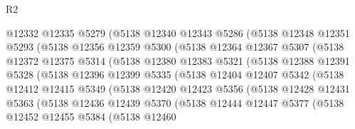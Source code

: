 \begin{lexlean}{R2}
\begin{coremodule}
                  @12332
                  @12335
                  @5279
                  (@5138
                    @12340
                    @12343
                    @5286
                    (@5138
                      @12348
                      @12351
                      @5293
                      (@5138
                        @12356
                        @12359
                        @5300
                        (@5138
                          @12364
                          @12367
                          @5307
                          (@5138
                            @12372
                            @12375
                            @5314
                            (@5138
                              @12380
                              @12383
                              @5321
                              (@5138
                                @12388
                                @12391
                                @5328
                                (@5138
                                  @12396
                                  @12399
                                  @5335
                                  (@5138
                                    @12404
                                    @12407
                                    @5342
                                    (@5138
                                      @12412
                                      @12415
                                      @5349
                                      (@5138
                                        @12420
                                        @12423
                                        @5356
                                        (@5138
                                          @12428
                                          @12431
                                          @5363
                                          (@5138
                                            @12436
                                            @12439
                                            @5370
                                            (@5138
                                              @12444
                                              @12447
                                              @5377
                                              (@5138
                                                @12452
                                                @12455
                                                @5384
                                                (@5138
                                                  @12460

\end{coremodule}
\end{lexlean}
